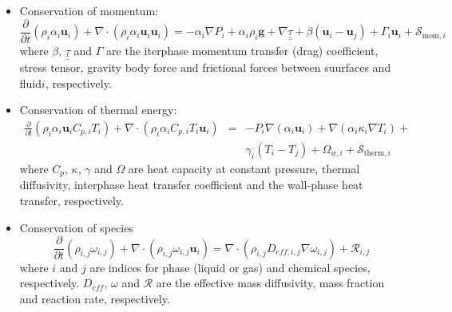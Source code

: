 \documentclass[calculator,datasheet,solutions]{exam}
\newcommand{\frc}{\displaystyle\frac}
\begin{document}
\begin{question}
\begin{itemize}
\item Conservation of momentum:
\begin{displaymath}
\frc{\partial}{\partial t}\left(\rho_{i}\alpha_{i}\mathbf{u}_{i}\right) + \nabla\cdot\left(\rho_{i}\alpha_{i}\mathbf{u}_{i}\mathbf{u}_{i}\right) = -\alpha_{i}\nabla P_{i} + \alpha_{i}\rho_{i}\mathbf{g} + \nabla\underline{\underline{\tau}} +\beta\left(\mathbf{u}_{i}-\mathbf{u}_{j}\right) + \Gamma_{i}\mathbf{u}_{i} + \mathcal{S}_{\text{mom},i}
\end{displaymath}
where $\beta$, $\underline{\underline{\tau}}$ and $\Gamma$ are the iterphase momentum transfer (drag) coefficient, stress tensor, gravity body force and frictional forces between suurfaces and fluid$i$, respectively. 

\item Conservation of thermal energy:
\begin{eqnarray}
\frc{\partial}{\partial t}\left(\rho_{i}\alpha_{i}\mathbf{u}_{i}C_{p,i}T_{i}\right) + \nabla\cdot\left(\rho_{i}\alpha_{i}C_{p,i}T_{i}\mathbf{u}_{i}\right) &=& -P_{i}\nabla\left(\alpha_{i}\mathbf{u}_{i}\right) + \nabla\left(\alpha_{i}\kappa_{i}\nabla T_{i}\right) + \nonumber \\
&& \gamma_{i}\left(T_{i}-T_{j}\right) + \Omega_{w,i} + \mathcal{S}_{\text{therm},i} \nonumber
\end{eqnarray}
where $C_{p}$, $\kappa$, $\gamma$ and $\Omega$ are heat capacity at constant pressure, thermal diffusivity, interphase heat transfer coefficient and the wall-phase heat transfer, respectively.

\item Conservation of species
\begin{displaymath}
\frc{\partial}{\partial t}\left(\rho_{i,j}\omega_{i,j}\right) + \nabla\cdot\left(\rho_{i,j}\omega_{i,j} \mathbf{u}_{i}\right) = \nabla\cdot\left(\rho_{i,j}D_{eff,i,j}\nabla\omega_{i,j}\right) + \mathcal{R}_{i,j}
\end{displaymath}
where $i$ and $j$ are indices for phase (liquid or gas) and chemical species, respectively. $D_{eff}$, $\omega$ and $\mathcal{R}$ are the effective mass diffusivity, mass fraction and reaction rate, respectively.


\end{itemize}
\end{question}
\end{document}
